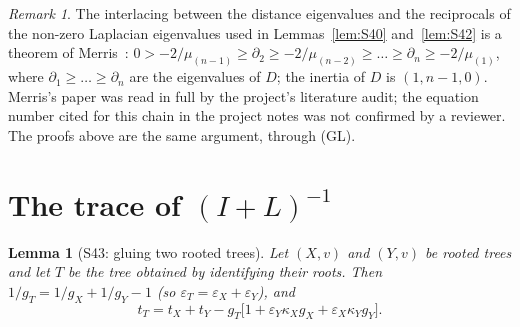 \documentclass[11pt]{amsart}
\newtheorem{lemma}[theorem]{Lemma}
\theoremstyle{definition}
\theoremstyle{remark}
\newtheorem{remark}[theorem]{Remark}
\begin{document}
\begin{remark}
The interlacing between the distance eigenvalues and the reciprocals of the
non-zero Laplacian eigenvalues used in Lemmas~\ref{lem:S40}
and~\ref{lem:S42} is a theorem of Merris~\cite{Mer90}:
$0>-2/\mu_{(n-1)}\ge\partial_2\ge-2/\mu_{(n-2)}\ge\dots\ge\partial_n\ge-2/\mu_{(1)}$,
where $\partial_1\ge\dots\ge\partial_n$ are the eigenvalues of $D$; the
inertia of $D$ is $(1,n-1,0)$. Merris's paper was read in full by the
project's literature audit; the equation number cited for this chain in the
project notes was not confirmed by a reviewer. The proofs above are the
same argument, through (GL).
\end{remark}

\section{The trace of \texorpdfstring{$(I+L)^{-1}$}{(I+L)\^{}(-1)}}\label{sec:trace}

\begin{lemma}[S43: gluing two rooted trees]\label{lem:S43}
Let $(X,v)$ and $(Y,v)$ be rooted trees and let $T$ be the tree obtained by
identifying their roots. Then $1/g_T=1/g_X+1/g_Y-1$ (so
$\varepsilon_T=\varepsilon_X+\varepsilon_Y$), and
\[
t_T=t_X+t_Y-g_T\bigl[1+\varepsilon_Y\kappa_Xg_X+\varepsilon_X\kappa_Yg_Y\bigr].
\]
\end{lemma}
\end{document}
